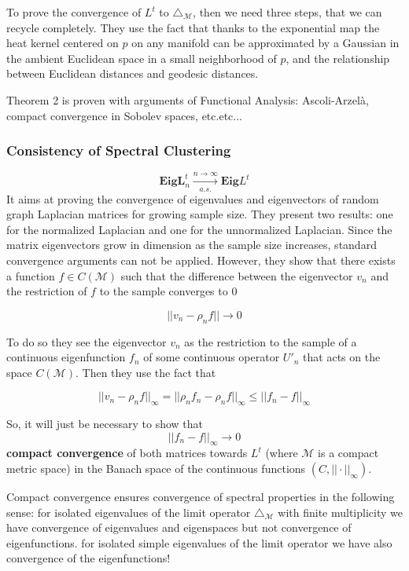 To prove the convergence of $L^t$ to $\triangle_\mathcal M$, then we need three steps, that we can recycle completely. They use the fact that thanks to the exponential map the heat kernel centered on $p$ on any manifold can be approximated by a Gaussian in the ambient Euclidean space in a small neighborhood of $p$, and the relationship between Euclidean distances and geodesic distances.

Theorem 2 is proven with arguments of Functional Analysis: Ascoli-Arzelà, compact convergence in Sobolev spaces, etc.etc...

\subsubsection{Consistency of Spectral Clustering}
$$ \mathbf{Eig} \mathbf{L}^t_n \xrightarrow[a.s.]{n\to\infty} \mathbf{Eig} L^t $$
It aims at proving the convergence of eigenvalues and eigenvectors of random graph Laplacian matrices for growing sample size. They present two results: one for the normalized Laplacian and one for the unnormalized Laplacian. Since the matrix eigenvectors grow in dimension as the sample size increases, standard convergence arguments can not be applied. However, they show that there exists a function $f\in C(\mathcal M)$ such that the difference between the eigenvector $v_n$ and the restriction of $f$ to the sample converges to $0$

$$||v_n-\rho_nf||\rightarrow 0$$

To do so they see the eigenvector $v_n$ as the restriction to the sample of a continuous eigenfunction $f_n$ of some continuous operator $U'_n$ that acts on the space $C(\mathcal M)$. Then they use the fact that 

$$||v_n-\rho_nf||_\infty = ||\rho_nf_n-\rho_nf||_\infty\leq ||f_n-f||_\infty$$


So, it will just be necessary to show that  $$||f_n-f||_\infty\rightarrow 0$$
\textbf{compact convergence} of both matrices towards $L^t$ (where $\mathcal M$ is a compact metric space) in the Banach space of the continuous functions $(C, ||\cdot||_\infty)$. 

Compact convergence ensures convergence of spectral properties in the following sense: for isolated eigenvalues of the limit operator $\triangle_\mathcal M$ with finite multiplicity we have convergence of eigenvalues and eigenspaces but not convergence of eigenfunctions. for isolated simple eigenvalues of the limit operator we have also convergence of the eigenfunctions!

